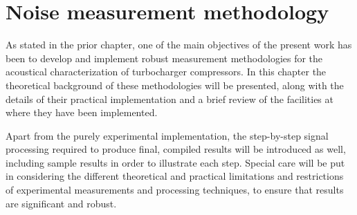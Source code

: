 \chapter{Noise measurement methodology} \label{cap:metod}



\noindent As stated in the prior chapter, one of the main objectives of the present work has been to develop and implement robust measurement methodologies for the acoustical characterization of turbocharger compressors. In this chapter the theoretical background of these methodologies will be presented, along with the details of their practical implementation and a brief review of the facilities at where they have been implemented.

Apart from the purely experimental implementation, the step-by-step signal processing required to produce final, compiled results will be introduced as well, including sample results in order to illustrate each step. Special care will be put in considering the different theoretical and practical limitations and restrictions of experimental measurements and processing techniques, to ensure that results are significant and robust.

